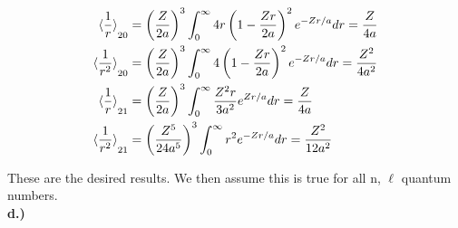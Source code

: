 \documentclass[10pt]{article} %
\begin{document}
\begin{align*}
  \braket{\frac{1}{r}}_{20} &= \left(\frac{Z}{2a}\right)^3\int_0^\infty
  4r\left(1-\frac{Zr}{2a}\right)^2e^{-Zr/a}dr = \frac{Z}{4a}\\
  \braket{\frac{1}{r^2}}_{20} &= \left(\frac{Z}{2a}\right)^3\int_0^\infty
  4\left(1-\frac{Zr}{2a}\right)^2e^{-Zr/a}dr = \frac{Z^2}{4a^2}\\
  \braket{\frac{1}{r}}_{21} &= \left(\frac{Z}{2a}\right)^3\int_0^\infty
  \frac{Z^2r}{3a^2}e^{Zr/a}dr = \frac{Z}{4a}\\
  \braket{\frac{1}{r^2}}_{21} &= \left(\frac{Z^5}{24a^5}\right)^3\int_0^\infty
  r^2e^{-Zr/a}dr = \frac{Z^2}{12a^2}\\
\end{align*}

These are the desired results. We then assume this is true for all n, $\ell$ quantum numbers.\\

\textbf{d.)}
\end{document}
